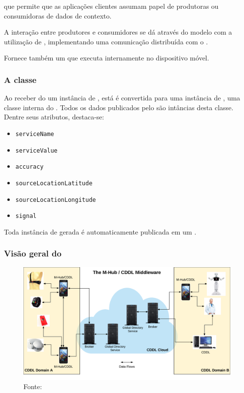 \documentclass[aspectratio=169]{beamer}
\begin{document}
\begin{frame}
	\frametitle{\cddl}
	\Middleware \iomt que permite que as aplicações clientes assumam papel de produtoras ou consumidoras de dados de contexto.
	
	\bigskip
	A interação entre produtores e consumidores se dá através do modelo \pubsub com a utilização de \brokers, implementando uma comunicação distribuída com o \mqtt.
	\bigskip
	
	Fornece também um \ubroker que executa internamente no dispositivo móvel.
\end{frame}

\begin{frame}
	\frametitle{A classe \msg}
	Ao receber do \mhub um instância de \sensordata, está é convertida para uma instância de \msg, uma classe interna do \cddl.
	Todos os dados publicados pelo \cddl são intâncias desta classe. Dentre seus atributos, destaca-se:
	\begin{itemize}
		\item \texttt{serviceName}

		\item \texttt{serviceValue}

		\item \texttt{accuracy}

		\item \texttt{sourceLocationLatitude}

		\item \texttt{sourceLocationLongitude}

		\item \texttt{signal}
	\end{itemize}
	Toda instância de \msg gerada é automaticamente publicada em um \broker.
\end{frame}

\begin{frame}
	\frametitle{Visão geral do \mhubcddl}
	\begin{figure}
		\centering
		\includegraphics[width=0.70\linewidth]{img/general-vision-cddl.png}
		\caption{Fonte: \cite{gomes:2017}}
	\end{figure}
\end{frame}
\end{document}
